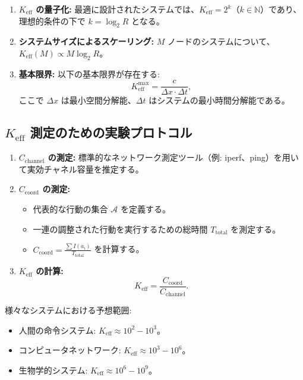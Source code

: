\documentclass[12pt,a4paper]{ltjsarticle}
\begin{document}
	\begin{enumerate}
		\item \textbf{$K_{\mathrm{eff}}$ の量子化:} 最適に設計されたシステムでは、$K_{\mathrm{eff}} = 2^k$（$k \in \mathbb{N}$）であり、理想的条件の下で $k = \log_2 R$ となる。
		
		\item \textbf{システムサイズによるスケーリング:} $M$ ノードのシステムについて、$K_{\mathrm{eff}}(M) \propto M \log_2 R$。
		
		\item \textbf{基本限界:} 以下の基本限界が存在する:
		\[
		K_{\mathrm{eff}}^{\text{max}} = \frac{c}{\Delta x \cdot \Delta t},
		\]
		ここで $\Delta x$ は最小空間分解能、$\Delta t$ はシステムの最小時間分解能である。
	\end{enumerate}
	
	\subsection{$K_{\mathrm{eff}}$ 測定のための実験プロトコル}
	\label{app:experiment}
	
	\begin{enumerate}
		\item \textbf{$C_{\text{channel}}$ の測定:} 標準的なネットワーク測定ツール（例: iperf、ping）を用いて実効チャネル容量を推定する。
		
		\item \textbf{$C_{\text{coord}}$ の測定:}
		\begin{itemize}
			\item 代表的な行動の集合 $\mathcal{A}$ を定義する。
			\item 一連の調整された行動を実行するための総時間 $T_{\text{total}}$ を測定する。
			\item $C_{\text{coord}} = \frac{\sum I(a_i)}{T_{\text{total}}}$ を計算する。
		\end{itemize}
		
		\item \textbf{$K_{\mathrm{eff}}$ の計算:}
		\[
		K_{\mathrm{eff}} = \frac{C_{\text{coord}}}{C_{\text{channel}}}.
		\]
	\end{enumerate}
	
	様々なシステムにおける予想範囲:
	\begin{itemize}
		\item 人間の命令システム: $K_{\mathrm{eff}} \approx 10^2 - 10^3$。
		\item コンピュータネットワーク: $K_{\mathrm{eff}} \approx 10^3 - 10^6$。
		\item 生物学的システム: $K_{\mathrm{eff}} \approx 10^6 - 10^9$。
	\end{itemize}
	
\end{document}

